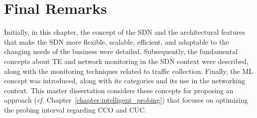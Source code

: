 \section{Final Remarks}
\label{sec:final_remarks_kap2}

Initially, in this chapter, the concept of the SDN  and the architectural features that make the SDN more flexible, scalable, efficient, and adaptable to the changing needs of the business were detailed. Subsequently, the fundamental concepts about TE and network monitoring in the SDN context were described, along with the monitoring techniques related to traffic collection. Finally, the ML concept was introduced, along with its categories and its use in the networking context. This master dissertation considers these concepts for proposing an approach (\textit{cf.} Chapter~\ref{chapter:intelligent_probing}) that focuses on optimizing the probing interval regarding CCO and CUC.